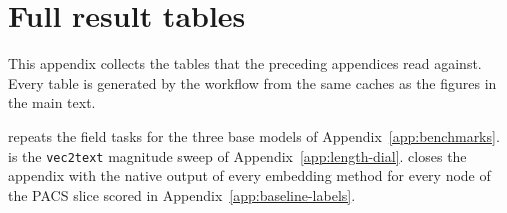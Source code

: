 \section{Full result tables}
\label{app:tables}

This appendix collects the tables that the preceding appendices read against.
Every table is generated by the workflow from the same caches as the figures in the main text.

 repeats the field tasks for the three base models of Appendix~\ref{app:benchmarks}.
 is the \texttt{vec2text} magnitude sweep of Appendix~\ref{app:length-dial}.
 closes the appendix with the native output of every embedding method for every node of the PACS slice scored in Appendix~\ref{app:baseline-labels}.

\begin{table}[htbp]
\centering
\small
\caption{Per-encoder field-task matrix. Each cell reports the two \doctolora variants as raw\,/\,+$g_\theta$ (the frozen embedding and the single general citation transform), with metrics, evaluation pools, and bootstrap protocol as in  (standard deviations omitted). Text-baseline scores are encoder-independent and given in .}
\label{tab:encoder-matrix}

\end{table}



